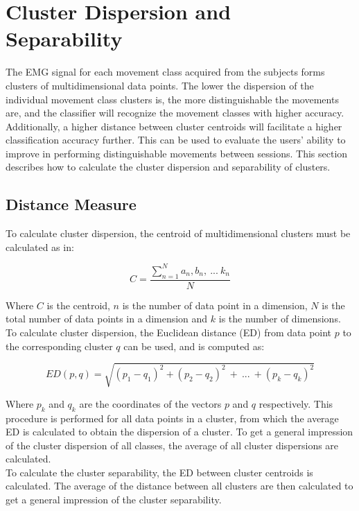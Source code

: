 \section{Cluster Dispersion and Separability} \label{sec:BG:dataSeparability}
The EMG signal for each movement class acquired from the subjects forms clusters of multidimensional data points. The lower the dispersion of the individual movement class clusters is, the more distinguishable the movements are, and the classifier will recognize the movement classes with higher accuracy. Additionally, a higher distance between cluster centroids will facilitate a higher classification accuracy further. This can be used to evaluate the users' ability to improve in performing distinguishable movements between sessions. This section describes how to calculate the cluster dispersion and separability of clusters. \\

\subsection{Distance Measure} \label{sub:BG:distanceMeasure}
To calculate cluster dispersion, the centroid of multidimensional clusters must be calculated as in:

\begin{equation} \label{eq:centroid}
C = \frac{\sum\limits_{n=1}^{N}a_{n},b_{n},~...~k_{n}}{N}
\end{equation}

Where $C$ is the centroid, $n$ is the number of data point in a dimension, $N$ is the total number of data points in a dimension and $k$ is the number of dimensions. To calculate cluster dispersion, the Euclidean distance (ED) from data point $p$ to the corresponding cluster $q$ can be used, and is computed as: %

\begin{equation} \label{eq:euclidiandistance}
ED(p,q) = \sqrt{(p_1-q_1)^2 + (p_2-q_2)^2~+~...~+ (p_k-q_k)^2}
\end{equation} 

Where $p_k$ and $q_k$ are the coordinates of the vectors $p$ and $q$ respectively. This procedure is performed for all data points in a cluster, from which the average ED is calculated to obtain the dispersion of a cluster. To get a general impression of the cluster dispersion of all classes, the average of all cluster dispersions are calculated.\\
To calculate the cluster separability, the ED between cluster centroids is calculated. The average of the distance between all clusters are then calculated to get a general impression of the cluster separability.   

